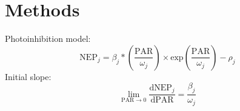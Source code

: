 

\section*{Methods}

Photoinhibition model:
%
\begin{equation} 
    \text{NEP}_j = \beta_j * \left(\frac{\text{PAR}}{\omega_j} \right) 
                    \times \text{exp} \left(\frac{\text{PAR}}{\omega_j} \right)
                      - \rho_j
\end{equation}
%
Initial slope:
%
\begin{equation} 
    \lim_{\text{PAR}\to 0} \frac{\text{d}\text{NEP}_j}{\text{d}\text{PAR}} = 
        \frac{\beta_j}{\omega_j}
\end{equation}
%